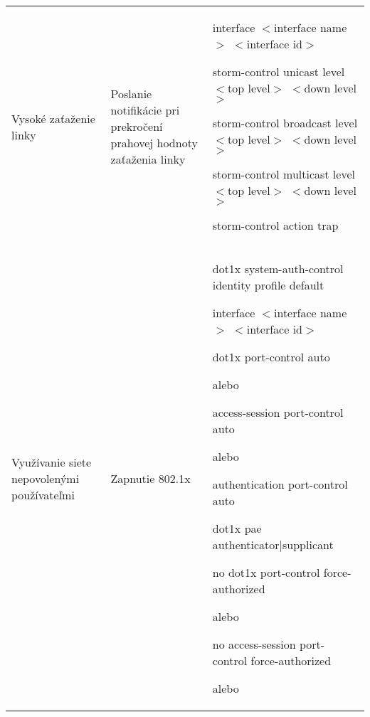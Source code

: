 \begin{longtable}[!htbp]{|L{10em}L{10em}>{\selectfont}L{34em}|}
	
	
	
	Vysoké zaťaženie linky	&Poslanie notifikácie pri prekročení prahovej hodnoty zaťaženia linky	&interface $<$interface name$>$ $<$interface id$>$
	
	\hspace{0.5em}storm-control unicast level $<$top level$>$ $<$down level$>$
	
	\hspace{0.5em}storm-control broadcast level $<$top level$>$ $<$down level$>$
	
	\hspace{0.5em}storm-control multicast level $<$top level$>$ $<$down level$>$
	
	\hspace{0.5em}storm-control action trap\\
	
	
	
	
	 Využívanie siete nepovolenými používateľmi	&Zapnutie 802.1x 	&dot1x system-auth-control
	identity profile default
	
	
	interface $<$interface name$>$ $<$interface id$>$
	
	\hspace{0.5em}dot1x port-control auto
	
	\vspace{0.5em}
	{\selectfont alebo}
	\hspace{0.5em}
	
	\hspace{0.5em}access-session port-control auto
	
	\vspace{0.5em}
	{\selectfont alebo}
	\vspace{0.5em}
	
	\hspace{0.5em}authentication port-control auto
	
	\hspace{0.5em}dot1x pae authenticator|supplicant 
	
	\hspace{0.5em}no dot1x port-control force-authorized
	
	\vspace{0.5em}
	{\selectfont alebo}
	\vspace{0.5em}
	
	\hspace{0.5em}no access-session port-control force-authorized
	
	\vspace{0.5em}
	{\selectfont alebo}
	\vspace{0.5em}
	

\end{longtable}

